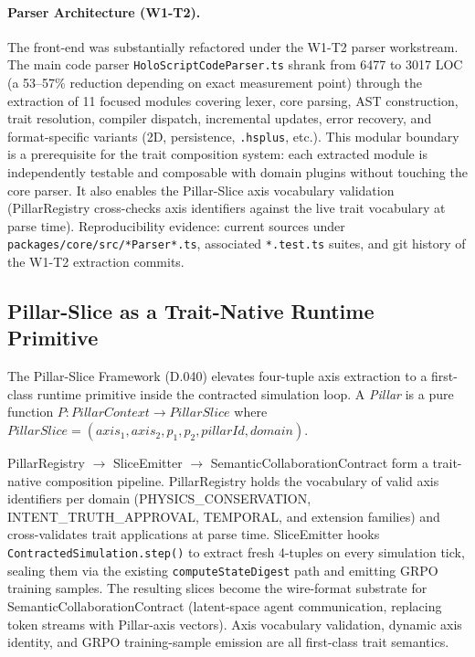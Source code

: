\documentclass[sigconf,nonacm]{acmart}
\newcommand{\hsplus}{\texttt{.hsplus}}
\begin{document}
\paragraph{Parser Architecture (W1-T2).}
The front-end was substantially refactored under the W1-T2 parser workstream.
The main code parser \texttt{HoloScriptCodeParser.ts} shrank from 6477 to 3017
LOC (a 53--57\% reduction depending on exact measurement point) through the
extraction of 11 focused modules covering lexer, core parsing, AST construction,
trait resolution, compiler dispatch, incremental updates, error recovery,
and format-specific variants (2D, persistence, \hsplus, etc.).
This modular boundary is a prerequisite for the trait composition system:
each extracted module is independently testable and composable with domain
plugins without touching the core parser. It also enables the Pillar-Slice
axis vocabulary validation (PillarRegistry cross-checks axis identifiers
against the live trait vocabulary at parse time). Reproducibility evidence:
current sources under \texttt{packages/core/src/*Parser*.ts}, associated
\texttt{*.test.ts} suites, and git history of the W1-T2 extraction commits.

\subsection{Pillar-Slice as a Trait-Native Runtime Primitive}
\label{sec:pillar-slice}

The Pillar-Slice Framework (D.040) elevates four-tuple axis extraction
to a first-class runtime primitive inside the contracted simulation loop.
A \emph{Pillar} is a pure function $P: \textit{PillarContext} \to \textit{PillarSlice}$
where $\textit{PillarSlice} = (\textit{axis}_1, \textit{axis}_2, p_1, p_2, \textit{pillarId}, \textit{domain})$.

PillarRegistry $\to$ SliceEmitter $\to$ SemanticCollaborationContract form a
trait-native composition pipeline. PillarRegistry holds the vocabulary of
valid axis identifiers per domain (PHYSICS\_CONSERVATION, INTENT\_TRUTH\_APPROVAL,
TEMPORAL, and extension families) and cross-validates trait applications at
parse time. SliceEmitter hooks \texttt{ContractedSimulation.step()} to extract
fresh 4-tuples on every simulation tick, sealing them via the existing
\texttt{computeStateDigest} path and emitting GRPO training samples.
The resulting slices become the wire-format substrate for
SemanticCollaborationContract (latent-space agent communication, replacing
token streams with Pillar-axis vectors). Axis vocabulary validation,
dynamic axis identity, and GRPO training-sample emission are all first-class
trait semantics.
\end{document}
